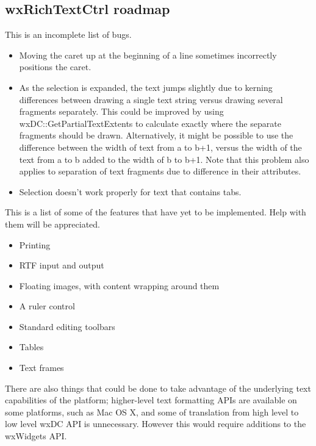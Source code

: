 \subsection{wxRichTextCtrl roadmap}


This is an incomplete list of bugs.

\begin{itemize}\itemsep=0pt
\item Moving the caret up at the beginning of a line sometimes incorrectly positions the
caret.
\item As the selection is expanded, the text jumps slightly due to kerning differences between
drawing a single text string versus drawing several fragments separately. This could
be improved by using wxDC::GetPartialTextExtents to calculate exactly where the separate fragments
should be drawn.
Alternatively, it might be possible to use the difference between the width of text from
a to b+1, versus the width of the text from a to b added to the width of b to b+1.
Note that this problem also applies to separation of text fragments due to difference in their attributes.
\item Selection doesn't work properly for text that contains tabs.
\end{itemize}


This is a list of some of the features that have yet to be implemented. Help with them will be appreciated.

\begin{itemize}\itemsep=0pt
\item Printing
\item RTF input and output
\item Floating images, with content wrapping around them
\item A ruler control
\item Standard editing toolbars
\item Tables
\item Text frames
\end{itemize}

There are also things that could be done to take advantage of the underlying text capabilities of the platform;
higher-level text formatting APIs are available on some platforms, such as Mac OS X, and some of translation from
high level to low level wxDC API is unnecessary. However this would require additions to the wxWidgets API.

